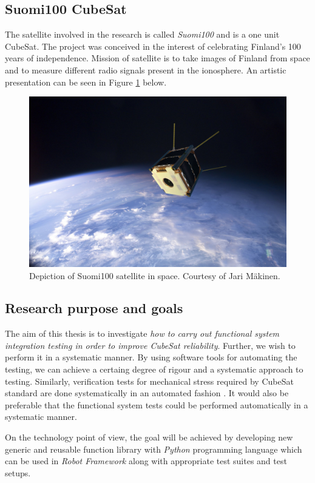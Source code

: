 \documentclass[english,12pt,a4paper,pdftex,elec,utf8]{aaltothesis}
\begin{document}
\subsection{Suomi100 CubeSat} 
The satellite involved in the research is called \textit{Suomi100} and is a one unit CubeSat. The project was conceived in the interest of celebrating Finland's 100 years of independence. Mission of satellite is to take images of Finland from space and to measure different radio signals present in the ionosphere. An artistic presentation can be seen in Figure \ref{s100intro} below.
\begin{figure}[!h]
\centering
\includegraphics[scale=0.2]{s100_orbit}
\caption{Depiction of Suomi100 satellite in space. Courtesy of Jari Mäkinen. \cite{s100blogi}}
\label{s100intro}
\end{figure} 
\subsection{Research purpose and goals}
The aim of this thesis is to investigate \textit{how to carry out
functional system integration testing in order to improve CubeSat reliability}. Further, we wish to perform it in a systematic manner. By using software tools for automating the testing, we can achieve a certaing degree of rigour and a systematic approach to testing. Similarly, verification tests for mechanical stress required by CubeSat standard are done systematically in an automated fashion \cite{cds}. It would also be preferable that the functional system tests could be performed automatically in a systematic manner.\par 
On the technology point of view, the goal will be achieved by developing new generic and reusable function library with \textit{Python} programming language which can be used in \textit{Robot Framework} \cite{robotmain} along with appropriate test suites and test setups.\par 
\end{document}
